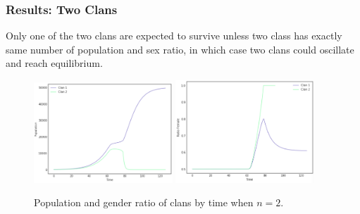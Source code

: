 \documentclass[t]{beamer}
\begin{document}




\begin{frame}
\frametitle{Results: Two Clans}
Only one of the two clans are expected to survive unless two class has exactly same number of population and sex ratio, in which case two clans could oscillate and reach equilibrium. 

\begin{figure}
\includegraphics[width=5.2cm]{twoclanpop.png}
\includegraphics[width=5.2cm]{twoclanratio.png}
\caption{Population and gender ratio of clans by time when $n=2$.}
\end{figure}

\end{frame}
\end{document}
